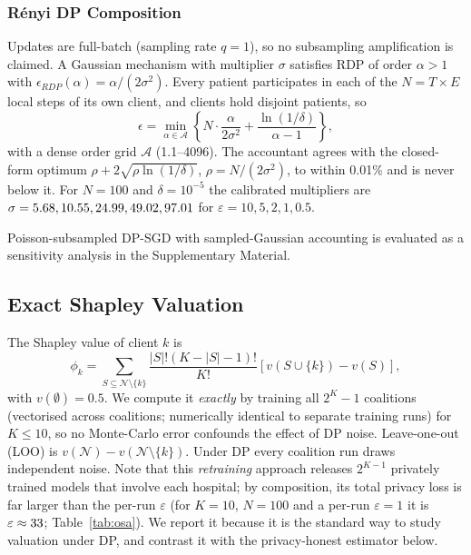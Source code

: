 \documentclass[journal]{IEEEtran}
\begin{document}
\subsubsection{Rényi DP Composition}
Updates are full-batch (sampling rate $q=1$), so no subsampling amplification is claimed. A Gaussian mechanism with multiplier $\sigma$ satisfies RDP of order $\alpha>1$ with $\epsilon_{RDP}(\alpha) = \alpha/(2\sigma^2)$. Every patient participates in each of the $N = T \times E$ local steps of its own client, and clients hold disjoint patients, so
\begin{equation}
\epsilon = \min_{\alpha \in \mathcal{A}} \left\{ N \cdot \frac{\alpha}{2 \sigma^2} + \frac{\ln(1/\delta)}{\alpha - 1} \right\},
\end{equation}
with a dense order grid $\mathcal{A}$ (1.1--4096). The accountant agrees with the closed-form optimum $\rho + 2\sqrt{\rho \ln(1/\delta)}$, $\rho = N/(2\sigma^2)$, to within 0.01\% and is never below it. For $N=100$ and $\delta=10^{-5}$ the calibrated multipliers are $\sigma = 5.68, 10.55, 24.99, 49.02, 97.01$ for $\varepsilon = 10, 5, 2, 1, 0.5$.

Poisson-subsampled DP-SGD with sampled-Gaussian accounting is evaluated as a sensitivity analysis in the Supplementary Material.



\subsection{Exact Shapley Valuation}
The Shapley value of client $k$ is
\begin{equation}
\phi_k = \sum_{S \subseteq \mathcal{N} \setminus \{k\}} \frac{|S|!(K - |S| - 1)!}{K!} \left[ v(S \cup \{k\}) - v(S) \right],
\end{equation}
with $v(\emptyset)=0.5$. We compute it \emph{exactly} by training all $2^K-1$ coalitions (vectorised across coalitions; numerically identical to separate training runs) for $K \le 10$, so no Monte-Carlo error confounds the effect of DP noise. Leave-one-out (LOO) is $v(\mathcal{N}) - v(\mathcal{N}\setminus\{k\})$. Under DP every coalition run draws independent noise. Note that this \emph{retraining} approach releases $2^{K-1}$ privately trained models that involve each hospital; by composition, its total privacy loss is far larger than the per-run $\varepsilon$ (for $K=10$, $N=100$ and a per-run $\varepsilon=1$ it is $\varepsilon\approx33$; Table~\ref{tab:osa}). We report it because it is the standard way to study valuation under DP, and contrast it with the privacy-honest estimator below.
\end{document}
